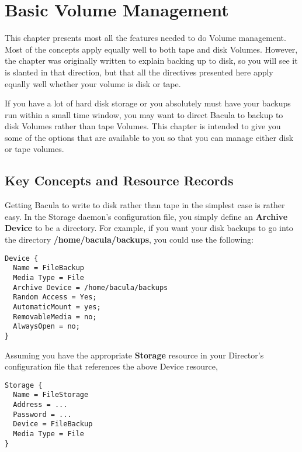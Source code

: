 
\section*{Basic Volume Management}
\label{_ChapterStart39}

This chapter presents most all the features needed to do Volume management.
Most of the concepts apply equally well to both tape and disk Volumes.
However, the chapter was originally written to explain backing up to disk, so
you will see it is slanted in that direction, but that all the directives
presented here apply equally well whether your volume is disk or tape. 

If you have a lot of hard disk storage or you absolutely must have your
backups run within a small time window, you may want to direct Bacula to
backup to disk Volumes rather than tape Volumes. This chapter is intended to
give you some of the options that are available to you so that you can manage
either disk or tape volumes. 
\label{Concepts}

\subsection*{Key Concepts and Resource Records}

Getting Bacula to write to disk rather than tape in the simplest case is
rather easy. In the Storage daemon's configuration file, you simply define an
{\bf Archive Device} to be a directory. For example, if you want your disk
backups to go into the directory {\bf /home/bacula/backups}, you could use the
following: 

\footnotesize
\begin{verbatim}
Device {
  Name = FileBackup
  Media Type = File
  Archive Device = /home/bacula/backups
  Random Access = Yes;
  AutomaticMount = yes;
  RemovableMedia = no;
  AlwaysOpen = no;
}
\end{verbatim}
\normalsize

Assuming you have the appropriate {\bf Storage} resource in your Director's
configuration file that references the above Device resource, 

\footnotesize
\begin{verbatim}
Storage {
  Name = FileStorage
  Address = ...
  Password = ...
  Device = FileBackup
  Media Type = File
}
\end{verbatim}
\normalsize

